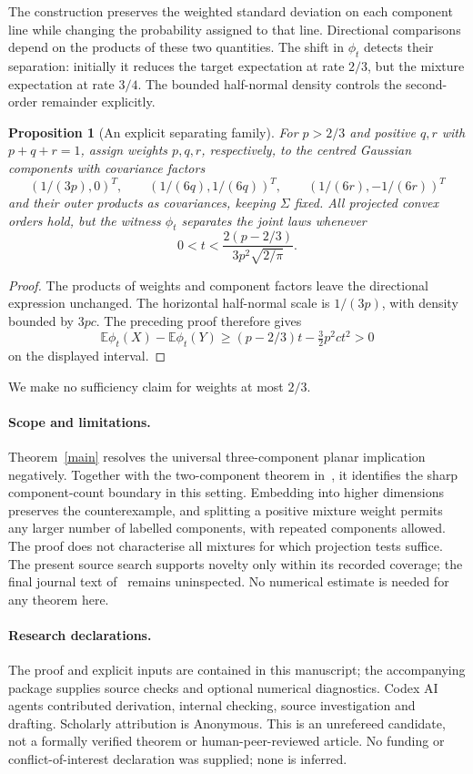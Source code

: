 \documentclass[11pt]{article}
\newtheorem{proposition}[theorem]{Proposition}
\newcommand{\E}{\mathbb E}
\begin{document}
The construction preserves the weighted standard deviation on each component line while changing the probability assigned to that line. Directional comparisons depend on the products of these two quantities. The shift in $\phi_t$ detects their separation: initially it reduces the target expectation at rate $2/3$, but the mixture expectation at rate $3/4$. The bounded half-normal density controls the second-order remainder explicitly.

\begin{proposition}[An explicit separating family]\label{family}
For $p>2/3$ and positive $q,r$ with $p+q+r=1$, assign weights $p,q,r$, respectively, to the centred Gaussian components with covariance factors
\[
 (1/(3p),0)^T,\qquad (1/(6q),1/(6q))^T,\qquad
 (1/(6r),-1/(6r))^T
\]
and their outer products as covariances, keeping $\Sigma$ fixed. All projected convex orders hold, but the witness $\phi_t$ separates the joint laws whenever
\[
0<t<\frac{2(p-2/3)}{3p^2\sqrt{2/\pi}}.
\]
\end{proposition}
\begin{proof}
The products of weights and component factors leave the directional expression unchanged. The horizontal half-normal scale is $1/(3p)$, with density bounded by $3pc$. The preceding proof therefore gives
\[
 \E\phi_t(X)-\E\phi_t(Y)
 \ge (p-2/3)t-\tfrac32p^2ct^2>0
\]
on the displayed interval.\end{proof}
We make no sufficiency claim for weights at most $2/3$.

\paragraph{Scope and limitations.}
Theorem~\ref{main} resolves the universal three-component planar implication negatively. Together with the two-component theorem in~\cite{G}, it identifies the sharp component-count boundary in this setting. Embedding into higher dimensions preserves the counterexample, and splitting a positive mixture weight permits any larger number of labelled components, with repeated components allowed. The proof does not characterise all mixtures for which projection tests suffice. The present source search supports novelty only within its recorded coverage; the final journal text of~\cite{JP} remains uninspected. No numerical estimate is needed for any theorem here.

\paragraph{Research declarations.}
The proof and explicit inputs are contained in this manuscript; the accompanying package supplies source checks and optional numerical diagnostics. Codex AI agents contributed derivation, internal checking, source investigation and drafting. Scholarly attribution is Anonymous. This is an unrefereed candidate, not a formally verified theorem or human-peer-reviewed article. No funding or conflict-of-interest declaration was supplied; none is inferred.
\end{document}
